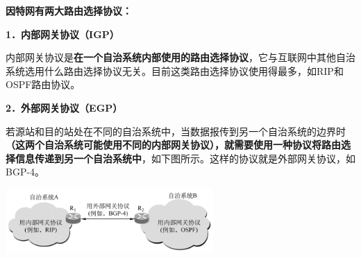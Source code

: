 \textbf{{因特网有两大路由选择协议：}}

\textbf{1．内部网关协议（IGP）}

内部网关协议是\textbf{在一个自治系统内部使用的路由选择协议}，它与互联网中其他自治系统选用什么路由选择协议无关。目前这类路由选择协议使用得最多，如RIP和OSPF路由协议。

\textbf{2．外部网关协议（EGP）}

若源站和目的站处在不同的自治系统中，当数据报传到另一个自治系统的边界时\textbf{（这两个自治系统可能使用不同的内部网关协议），就需要使用一种协议将路由选择信息传递到另一个自治系统中}，如下图所示。这样的协议就是外部网关协议，如BGP-4。

\includegraphics[width=3.12500in,height=0.95833in]{png-jpeg-pics/29BAEA565A731F32C14A2358F2264E1A.png}
